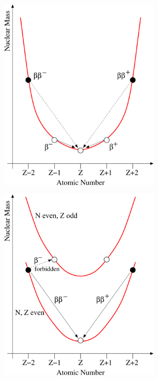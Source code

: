 \begin{figure}[htbp]
\centering
\begin{subfigure}[t]{0.40\textwidth}
\centering
\includegraphics[width=0.9\textwidth]{Figures/parabola_odd_edited.pdf}
\caption{}
\label{fig:parabola_odd}
\end{subfigure}
\qquad
\begin{subfigure}[t]{0.40\textwidth}
\centering
\includegraphics[width=0.9\textwidth]{Figures/parabola_even_edited.pdf}

\end{subfigure}
\end{figure}
